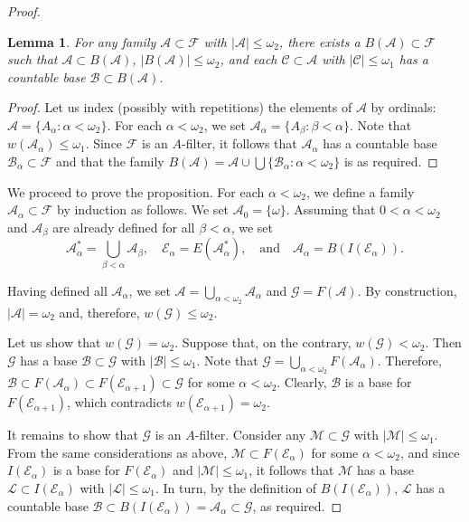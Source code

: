 \documentclass[10pt,a4paper]{amsart}
\newtheorem{lemma}{Lemma}
\begin{document}
\begin{proof}
\begin{lemma}
For any family $\mathscr A\subset \mathscr F$ with $|\mathscr A|\leq\omega_2$, there exists a $B(\mathscr 
A)\subset \mathscr F$ such that $\mathscr A\subset B(\mathscr A)$, $|B(\mathscr A)|\leq \omega_2$, and each 
$\mathscr C\subset \mathscr A$ with $|\mathscr C|\leq\omega_1$ has a countable base $\mathscr B\subset B(\mathscr 
A)$. 
\end{lemma}

\begin{proof}
Let us index (possibly with repetitions) the elements of $\mathscr A$ by ordinals: $\mathscr 
A=\{A_\alpha:\alpha<\omega_2\}$. For each $\alpha<\omega_2$, we set 
$\mathscr A_\alpha=\{A_\beta:\beta<\alpha\}$. 
Note that $w(\mathscr A_\alpha)\le\omega_1$. Since 
$\mathscr F$ is an $A$-filter, it follows that 
$\mathscr A_\alpha$ has a countable base $\mathscr B_\alpha\subset \mathscr F$ and that
the family $B(\mathscr A)=\mathscr A\cup
\bigcup\{\mathscr B_\alpha:\alpha<\omega_2\}$ is as 
required. 
\end{proof}

We proceed to prove the proposition. For each $\alpha<\omega_2$, we define 
a family $\mathscr A_\alpha\subset\mathscr F$ by induction as follows. We set $\mathscr A_0=\{\omega\}$. 
Assuming that $0<\alpha<\omega_2$ and $\mathscr A_\beta$ are already defined for all $\beta<\alpha$,  
we set 
$$
\mathscr A_\alpha^\ast=\bigcup_{\beta<\alpha}\mathscr A_\beta,\quad 
\mathscr E_\alpha=E(\mathscr A_\alpha^\ast),\quad \text{and}\quad 
\mathscr A_\alpha=B(I(\mathscr E_\alpha)).
$$

Having defined all $\mathscr A_\alpha$, we set 
$\mathscr A=\bigcup_{\alpha<\omega_2}\mathscr A_\alpha$ and $\mathscr 
G=F(\mathscr A)$. By construction, $|\mathscr A|=\omega_2$ and, therefore, $w(\mathscr G)\leq\omega_2$.

Let us show that $w(\mathscr G)=\omega_2$. Suppose that, on the contrary, $w(\mathscr G)<\omega_2$. 
Then $\mathscr G$ has a base $\mathscr B\subset \mathscr G$ with $|\mathscr B|\leq\omega_1$. Note that 
$\mathscr G=\bigcup_{\alpha<\omega_2}F(\mathscr A_\alpha)$. Therefore, $\mathscr B\subset 
F(\mathscr A_\alpha)\subset F(\mathscr E_{\alpha+1})\subset \mathscr G$ for some $\alpha<\omega_2$. 
Clearly, $\mathscr B$ is a base for $F(\mathscr E_{\alpha+1})$, which 
contradicts $w(\mathscr E_{\alpha+1})=\omega_2$.

It remains to show that $\mathscr G$ is an $A$-filter. Consider any $\mathscr M\subset \mathscr G$ with 
$|\mathscr M|\leq\omega_1$. From the same considerations as above, $\mathscr M\subset F(\mathscr E_\alpha)$ for some 
$\alpha<\omega_2$, and since $I(\mathscr E_\alpha)$ is a base for $F(\mathscr E_\alpha)$ and 
$|\mathscr M|\le \omega_1$, 
it follows that $\mathscr M$ has a base $\mathscr L\subset I(\mathscr E_\alpha)$ with 
$|\mathscr L|\leq\omega_1$. In turn, by the definition of $B(I(\mathscr E_\alpha))$, 
$\mathscr L$ has a countable base $\mathscr B\subset B(I(\mathscr E_\alpha))=\mathscr A_\alpha\subset \mathscr G$, 
as required. 
\end{proof}
\end{document}
